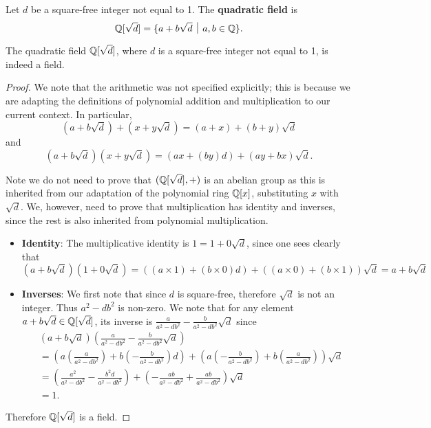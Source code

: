 \begin{definition}
    Let $d$ be a square-free integer not equal to 1. The \textbf{quadratic field} is
    \[
        \Q[\sqrt{d}] = \{a + b\sqrt{d} \vert a,b\in\Q\}.
    \]
\end{definition}
\begin{proposition}\label{prop-quadratic-field-is-a-field}
    The quadratic field $\mathbb{Q}[\sqrt{d}]$, where $d$ is a square-free integer not equal to 1, is indeed a field.
\end{proposition}
\begin{proof}
    We note that the arithmetic was not specified explicitly; this is because we are adapting the definitions of polynomial addition and multiplication to our current context. In particular,
    \[
        (a+b\sqrt{d}) + (x + y\sqrt{d}) = (a+x) + (b+y)\sqrt{d}
    \]
    and
    \[
        (a+b\sqrt{d})(x+y\sqrt{d}) = (ax+(by)d) + (ay + bx)\sqrt{d}.
    \]

    Note we do not need to prove that $(\mathbb{Q}[\sqrt{d}], +)$ is an abelian group as this is inherited from our adaptation of the polynomial ring $\mathbb{Q}[x]$, substituting $x$ with $\sqrt{d}$. We, however, need to prove that multiplication has identity and inverses, since the rest is also inherited from polynomial multiplication.

    \begin{itemize}
        \item \textbf{Identity}: The multiplicative identity is $1 = 1 + 0\sqrt{d}$, since one sees clearly that
        \[
            (a+b\sqrt{d})(1+0\sqrt{d}) = ((a\times1) + (b\times0)d) + ((a\times0) + (b \times 1))\sqrt{d} = a + b\sqrt{d}
        \]

        \item \textbf{Inverses}: We first note that since $d$ is square-free, therefore $\sqrt{d}$ is not an integer. Thus $a^2 - db^2$ is non-zero. We note that for any element $a+b\sqrt{d} \in \mathbb{Q}[\sqrt{d}]$, its inverse is $\frac{a}{a^2-db^2} - \frac{b}{a^2-db^2}\sqrt{d}$ since
        \begin{align*}
            &(a+b\sqrt{d})\left(\frac{a}{a^2-db^2} - \frac{b}{a^2-db^2}\sqrt{d}\right)\\
            &= \left(a\left(\frac{a}{a^2-db^2}\right) + b\left(-\frac{b}{a^2-db^2}\right)d\right) + \left(a\left(-\frac{b}{a^2-db^2}\right) + b\left(\frac{a}{a^2-db^2}\right)\right)\sqrt{d}\\
            &=\left(\frac{a^2}{a^2-db^2} -\frac{b^2d}{a^2-db^2}\right) + \left(-\frac{ab}{a^2-db^2} + \frac{ab}{a^2-db^2}\right)\sqrt{d}\\
            &=1.
        \end{align*}
    \end{itemize}

    Therefore $\mathbb{Q}[\sqrt{d}]$ is a field.
\end{proof}

